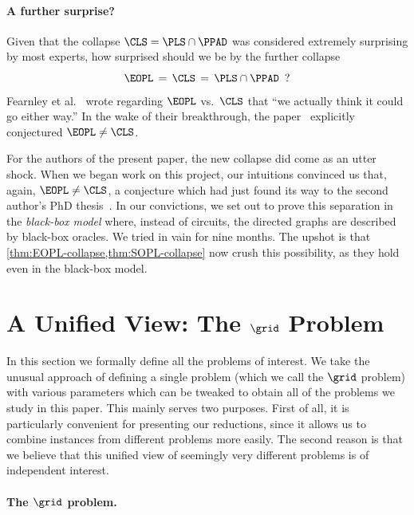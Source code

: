 \paragraph{A further surprise?}
Given that the collapse $\CLS=\PLS\cap\PPAD$ was considered extremely surprising by most experts, how surprised should we be by the further collapse
\[
\EOPL\, =\, \CLS\, =\, \PLS\cap\PPAD\enspace ?
\]
Fearnley et al.~\cite{Fearnley2020} wrote regarding $\EOPL$ vs.\ $\CLS$ that ``we actually think it could go either way.'' In the wake of their breakthrough, the paper~\cite{Fearnley2021} explicitly conjectured $\EOPL\neq\CLS$.

For the authors of the present paper, the new collapse did come as an utter shock. When we began work on this project, our intuitions convinced us that, again, $\EOPL\neq \CLS$, a conjecture which had just found its way to the second author's PhD thesis~\cite[Section~7.5]{Hollender2021}. In our convictions, we set out to prove this separation in the \emph{black-box model} where, instead of circuits, the directed graphs are described by black-box oracles. We tried in vain for nine months. The upshot is that \cref{thm:EOPL-collapse,thm:SOPL-collapse} now crush this possibility, as they hold even in the black-box model.










\section{A Unified View: The \texorpdfstring{$\grid$}{Grid} Problem}\label{sec:grid}

In this section we formally define all the problems of interest. We take the unusual approach of defining a single problem (which we call the $\grid$ problem) with various parameters which can be tweaked to obtain all of the problems we study in this paper. This mainly serves two purposes. First of all, it is particularly convenient for presenting our reductions, since it allows us to combine instances from different problems more easily. The second reason is that we believe that this unified view of seemingly very different problems is of independent interest.


\paragraph{The $\grid$ problem.}

